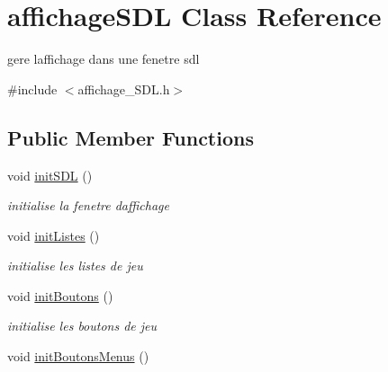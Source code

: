 \hypertarget{classaffichageSDL}{}\section{affichage\+S\+DL Class Reference}
\label{classaffichageSDL}


gere l\textquotesingle{}affichage dans une fenetre sdl  




{\ttfamily \#include $<$affichage\+\_\+\+S\+D\+L.\+h$>$}

\subsection*{Public Member Functions}
\begin{DoxyCompactItemize}
\item 
void \hyperlink{classaffichageSDL_a0328a046a518efb55f32b9b1a497819e}{init\+S\+DL} ()\hypertarget{classaffichageSDL_a0328a046a518efb55f32b9b1a497819e}{}\label{classaffichageSDL_a0328a046a518efb55f32b9b1a497819e}

\begin{DoxyCompactList}\small\item\em initialise la fenetre d\textquotesingle{}affichage \end{DoxyCompactList}\item 
void \hyperlink{classaffichageSDL_afeec5f3569debd68c5e68ebcddb59a77}{init\+Listes} ()\hypertarget{classaffichageSDL_afeec5f3569debd68c5e68ebcddb59a77}{}\label{classaffichageSDL_afeec5f3569debd68c5e68ebcddb59a77}

\begin{DoxyCompactList}\small\item\em initialise les listes de jeu \end{DoxyCompactList}\item 
void \hyperlink{classaffichageSDL_ad1889ea146099d600f1cf56b630e60b9}{init\+Boutons} ()\hypertarget{classaffichageSDL_ad1889ea146099d600f1cf56b630e60b9}{}\label{classaffichageSDL_ad1889ea146099d600f1cf56b630e60b9}

\begin{DoxyCompactList}\small\item\em initialise les boutons de jeu \end{DoxyCompactList}\item 
void \hyperlink{classaffichageSDL_acc7284fbe0e745814e95df5d9745d1e5}{init\+Boutons\+Menus} ()\hypertarget{classaffichageSDL_acc7284fbe0e745814e95df5d9745d1e5}{}\label{classaffichageSDL_acc7284fbe0e745814e95df5d9745d1e5}


\end{DoxyCompactItemize}
